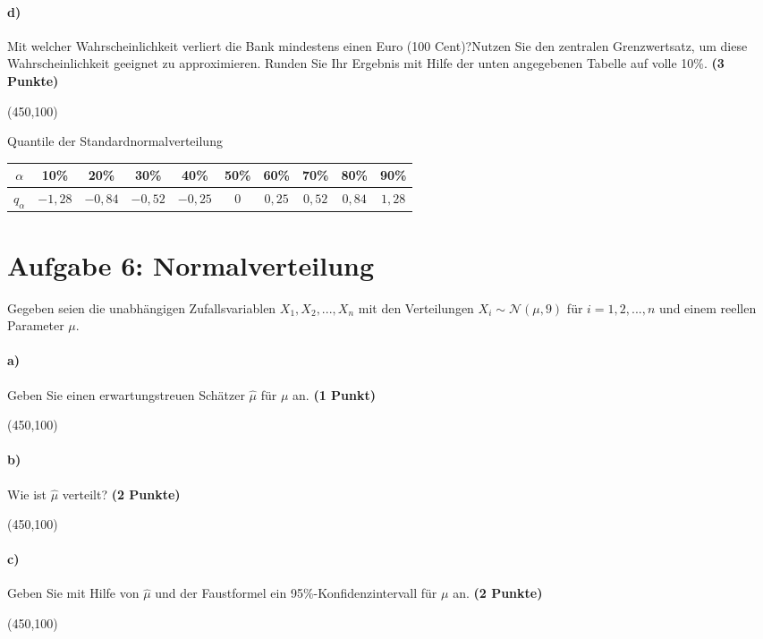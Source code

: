 \documentclass[10pt, a4paper]{article}
\begin{document}
\paragraph{d)} Mit welcher Wahrscheinlichkeit verliert die Bank mindestens einen Euro (100 Cent)?Nutzen Sie den zentralen Grenzwertsatz, um diese Wahrscheinlichkeit geeignet zu approximieren. Runden Sie Ihr Ergebnis mit Hilfe der unten angegebenen Tabelle auf volle 10\%. \textbf{(3 Punkte)}
\begin{center}
  \framebox(450,100){}
\end{center}

Quantile der Standardnormalverteilung
\begin{tabular}{c | c | c | c | c | c | c | c | c | c}
  $\alpha$   & 10\%  & 20\%  & 30\%  & 40\%  & 50\% & 60\%  & 70\%  & 80\%  & 90\%  \\\hline
  $q_{\alpha}$ & $-1,28$ & $-0,84$ & $-0,52$ & $-0,25$ & $0$ & $0,25$ & $0,52$ & $0,84$ & $1,28$
\end{tabular}

\section{Aufgabe 6: Normalverteilung}
Gegeben seien die unabhängigen Zufallsvariablen $X_1,X_2,...,X_n$ mit den Verteilungen $X_i \sim \mathcal{N}(\mu,9)$ für $i= 1,2,...,n$ und einem reellen Parameter $\mu$.
\paragraph{a)} Geben Sie einen erwartungstreuen Schätzer $\hat{\mu}$ für $\mu$ an. \textbf{(1 Punkt)}
\begin{center}
  \framebox(450,100){}
\end{center}

\paragraph{b)} Wie ist $\hat{\mu}$ verteilt? \textbf{(2 Punkte)}
\begin{center}
  \framebox(450,100){}
\end{center}

\paragraph{c)} Geben Sie mit Hilfe von $\hat{\mu}$ und der Faustformel ein 95\%-Konfidenzintervall für $\mu$ an. \textbf{(2 Punkte)}
\begin{center}
  \framebox(450,100){}
\end{center}
\end{document}
